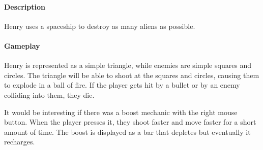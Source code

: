 \documentclass[12pt, a4paper, titlepage]{article}
\begin{document}
    	\paragraph{Description} Henry uses a spaceship to destroy as many aliens as possible.
	
	\paragraph{Gameplay} Henry is represented as a simple triangle, while enemies are simple squares and circles. The triangle will be able to shoot at the squares and circles,
	causing them to explode in a ball of fire. If the player gets hit by a bullet or by an enemy colliding into them, they die.
	
	It would be interesting if there was a boost mechanic with the right mouse button. When the player presses it, they shoot faster and move faster for a short amount of time. The boost
	is displayed as a bar that depletes but eventually it recharges.
    
    \subsection{}
    
\end{document}
